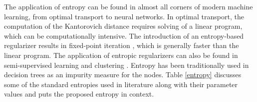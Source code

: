 \documentclass{article}
\begin{document}
The application of entropy can be found in almost all corners of modern machine learning, from optimal transport to neural networks. In optimal transport, the computation of the Kantorovich distance \citep{villani2008optimal} requires solving of a linear program, which can be computationally intensive. The introduction of an entropy-based regularizer results in fixed-point iteration \citep{cuturi2013sinkhorn}, which is generally faster than the linear program. The application of entropic regularizers can also be found in semi-supervised learning \citep{grandvalet2005semi,audiffren2015maximum} and clustering \citep{jing2007entropy,chakraborty2020entropy,paul2020bayesian,chakraborty2020automated}. Entropy has been traditionally used in decision trees \cite{wang1984analysis} as an impurity measure for the nodes. Table \ref{entropy} discusses some of the standard entropies used in literature along with their parameter values and puts the proposed entropy in context. 
\end{document}
